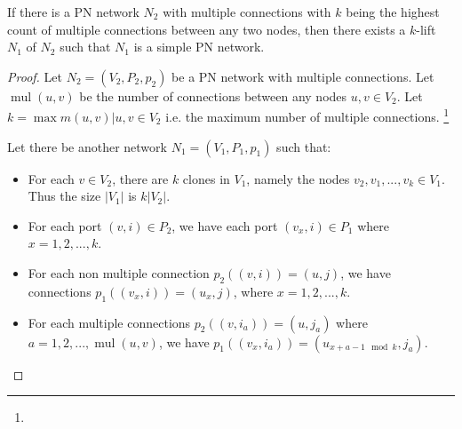 \begin{theorem} \label{thm:lcl_nonsolvability:3}
    If there is a PN network $N_2$ with multiple connections with $k$ being the highest count of multiple connections between any two nodes, then there exists a $k$-lift $N_1$ of $N_2$ such that $N_1$ is a simple PN network.
\end{theorem}
\begin{proof}
    Let $N_2=(V_2, P_2, p_2)$ be a PN network with multiple connections.
    Let $\operatorname{mul}(u, v)$ be the number of connections between any nodes $u, v \in V_2$.
    Let $k=\max {m(u, v) | u, v \in V_2}$ i.e. the maximum number of multiple connections.
    \footnote{}

    Let there be another network $N_1=(V_1, P_1, p_1)$ such that:
    \begin{itemize}
        \item For each $v \in V_2$, there are $k$ clones in $V_1$, namely the nodes $v_2, v_1, ..., v_k \in V_1$.
            Thus the size $|V_1|$ is $k|V_2|$.
        \item For each port $(v, i) \in P_2$, we have each port $(v_x, i) \in P_1$ where $x=1, 2, ..., k$.
        \item For each non multiple connection $p_2((v, i)) = (u, j)$, we have connections $p_1((v_x, i)) = (u_x, j)$, where $x=1, 2, ..., k$.
        \item For each multiple connections $p_2((v, i_a)) = (u, j_a)$ where $a = 1, 2, ..., \operatorname{mul}(u, v)$, we have $p_1((v_{x}, i_a)) = (u_{x+a-1 \mod k}, j_a)$.
    \end{itemize}


\end{proof}

